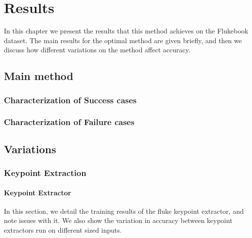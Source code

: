 
\chapter{Results} \label{sec:results}

In this chapter we present the results that this method achieves on the Flukebook dataset.
The main results for the optimal method are given briefly, and then we discuss how different variations on the method affect accuracy.

\section{Main method}


\subsection{Characterization of Success cases}

\subsection{Characterization of Failure cases}

\section{Variations}

\subsection{Keypoint Extraction}

\subsubsection{Keypoint Extractor}

In this section, we detail the training results of the fluke keypoint extractor, and note issues with it.
We also show the variation in accuracy between keypoint extractors run on different sized inputs.

